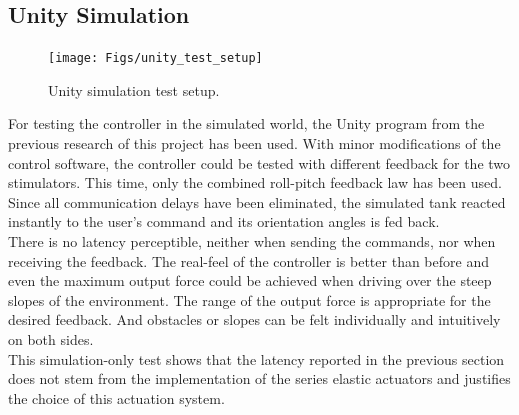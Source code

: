 \subsection{Unity Simulation}
\begin{figure}[h!]
	\centering
	\texttt{[image: Figs/unity\_test\_setup]}
	\caption{Unity simulation test setup.}
	\label{fig:unity_test_setup}
\end{figure}
For testing the controller in the simulated world, the Unity program from the previous research of this project has been used. With minor modifications of the control software, the controller could be tested with different feedback for the two stimulators. This time, only the combined roll-pitch feedback law has been used.\\
Since all communication delays have been eliminated, the simulated tank reacted instantly to the user's command and its orientation angles is fed back. \\
There is no latency perceptible, neither when sending the commands, nor when receiving the feedback. The real-feel of the controller is better than before and even the maximum output force could be achieved when driving over the steep slopes of the environment. The range of the output force is appropriate for the desired feedback. And obstacles or slopes can be felt individually and intuitively on both sides.\\
This simulation-only test shows that the latency reported in the previous section does not stem from the implementation of the series elastic actuators and justifies the choice of this actuation system.\\


